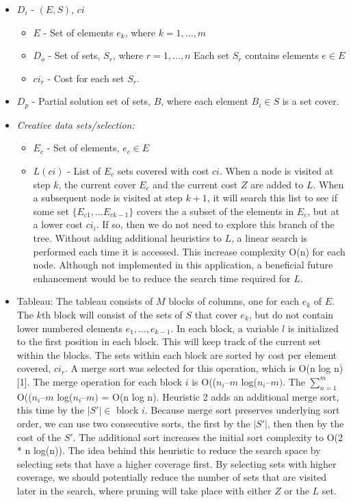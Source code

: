 \documentclass[12pt]{article}
\begin{document}
\begin{itemize}
	\item $D_i$ - $(E, S)$, $ci$
	\begin{itemize}
		\item $E$ - Set of elements $e_k$, where $k = 1,...,m$
		\item $D_o$ - Set of sets, $S_r$, where $r = 1,...,n$ Each set $S_r$ contains elements $e \in E$
		\item $ci_r$ - Cost for each set $S_r$.
	\end{itemize}
	\item $D_p$ - Partial solution set of sets, $B$, where each element $B_i \in S$ is a set cover.
\end{itemize}
\begin{itemize}
	\item \textit{Creative data sets/selection:}
	\begin{itemize}
		\item $E_c$ - Set of elements, $e_c \in E$
		\item $L(ci)$ - List of $E_c$ sets covered with cost $ci$. When a node is visited at step $k$, the current cover $E_c$ and the current cost $Z$ are added to $L$. When a subsequent node is visited at step $k + 1$, it will search this list to see if some set $\{E_{c1}, ... E_{ck-1}\}$ covers the a subset of the elements in $E_c$, but at a lower cost $ci_i$. If so, then we do not need to explore this branch of the tree. Without adding additional heuristics to $L$, a linear search is performed each time it is accessed. This increase complexity O(n) for each node. Although not implemented in this application, a beneficial future enhancement would be to reduce the search time required for $L$.
	\end{itemize}
	\item Tableau: The tableau consists of $M$ blocks of columns, one for each $e_k$ of $E$. The $k$th block will consist of the sets of $S$ that cover $e_k$, but do not contain lower numbered elements $e_1,...,e_{k-1}$. In each block, a variable $l$ is initialized to the first position in each block. This will keep track of the current set within the blocks. The sets within each block are sorted by cost per element covered, $ci_r$. A merge sort was selected for this operation, which is O(n log n) [1]. The merge operation for each block $i$ is O(($n_i – m$ log($n_i – m)$. The $\sum_{n = 1}^m$ O(($n_i – m$ log($n_i – m)$ = O(n log n). Heuristic 2 adds an additional merge sort, this time by the $|S\prime| \in$ block $i$. Because merge sort preserves underlying sort order, we can use two consecutive sorts, the first by the $|S\prime|$, then then by the cost of the $S\prime$. The additional sort increases the initial sort complexity to O(2 * n log(n)). The idea behind this heuristic to reduce the search space by selecting sets that have a higher coverage first. By selecting sets with higher coverage, we should potentially reduce the number of sets that are visited later in the search, where pruning will take place with either $Z$ or the $L$ set.
\end{itemize}
\end{document}
